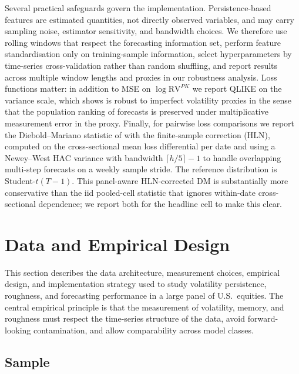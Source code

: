 \documentclass[11pt,a4paper]{article}
\newcommand{\RVPK}{\mathrm{RV}^{PK}}
\begin{document}
Several practical safeguards govern the implementation. Persistence-based
features are estimated quantities, not directly observed variables, and
may carry sampling noise, estimator sensitivity, and bandwidth choices.
We therefore use rolling windows that respect the forecasting information
set, perform feature standardisation only on training-sample information,
select hyperparameters by time-series cross-validation rather than random
shuffling, and report results across multiple window lengths and proxies
in our robustness analysis. Loss functions matter: in addition to MSE on
$\log\RVPK$ we report QLIKE on the variance scale, which
\citet{patton2011volatility} shows is robust to imperfect volatility
proxies in the sense that the population ranking of forecasts is
preserved under multiplicative measurement error in the proxy. Finally, for pairwise loss comparisons
we report the Diebold--Mariano statistic of
\citet{diebold1995comparing} with the
\citet{harvey1997testing} finite-sample correction (HLN), computed on
the cross-sectional mean loss differential per date and using a
Newey--West HAC variance with bandwidth $\lceil h/5\rceil-1$ to handle
overlapping multi-step forecasts on a weekly sample stride. The
reference distribution is Student-$t(T-1)$. This panel-aware
HLN-corrected DM is substantially more conservative than the iid
pooled-cell statistic that ignores within-date cross-sectional
dependence; we report both for the headline cell to make this clear.

\section{Data and Empirical Design}
\label{sec:data}

This section describes the data architecture, measurement choices,
empirical design, and implementation strategy used to study volatility
persistence, roughness, and forecasting performance in a large panel of
U.S.\ equities. The central empirical principle is that the measurement
of volatility, memory, and roughness must respect the time-series
structure of the data, avoid forward-looking contamination, and allow
comparability across model classes.

\subsection{Sample}
\end{document}
